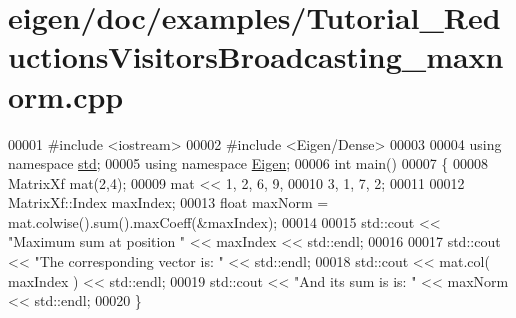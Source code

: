 \hypertarget{eigen_2doc_2examples_2_tutorial___reductions_visitors_broadcasting__maxnorm_8cpp_source}{}\section{eigen/doc/examples/\+Tutorial\+\_\+\+Reductions\+Visitors\+Broadcasting\+\_\+maxnorm.cpp}
\label{eigen_2doc_2examples_2_tutorial___reductions_visitors_broadcasting__maxnorm_8cpp_source}

\begin{DoxyCode}
00001 \textcolor{preprocessor}{#include <iostream>}
00002 \textcolor{preprocessor}{#include <Eigen/Dense>}
00003 
00004 \textcolor{keyword}{using namespace }\hyperlink{namespacestd}{std};
00005 \textcolor{keyword}{using namespace }\hyperlink{namespace_eigen}{Eigen};
00006 \textcolor{keywordtype}{int} main()
00007 \{
00008   MatrixXf mat(2,4);
00009   mat << 1, 2, 6, 9,
00010          3, 1, 7, 2;
00011   
00012   MatrixXf::Index   maxIndex;
00013   \textcolor{keywordtype}{float} maxNorm = mat.colwise().sum().maxCoeff(&maxIndex);
00014   
00015   std::cout << \textcolor{stringliteral}{"Maximum sum at position "} << maxIndex << std::endl;
00016 
00017   std::cout << \textcolor{stringliteral}{"The corresponding vector is: "} << std::endl;
00018   std::cout << mat.col( maxIndex ) << std::endl;
00019   std::cout << \textcolor{stringliteral}{"And its sum is is: "} << maxNorm << std::endl;
00020 \}
\end{DoxyCode}

